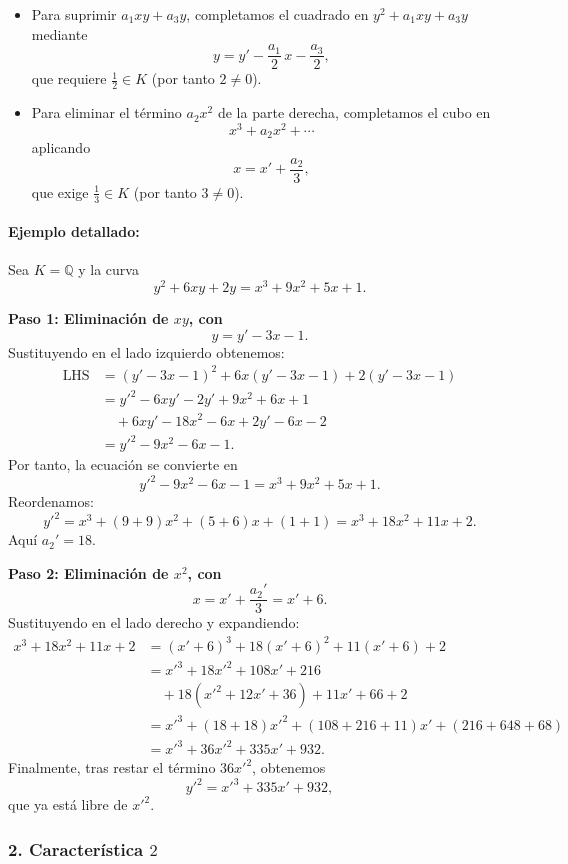 \begin{itemize}
  \item Para suprimir $a_1xy + a_3y$, completamos el cuadrado en $y^2 + a_1xy + a_3y$ mediante
    \[
      y = y' - \frac{a_1}{2}\,x - \frac{a_3}{2},
    \]
    que requiere $\tfrac12\in K$ (por tanto $2\neq0$).
  \item Para eliminar el término $a_2x^2$ de la parte derecha, completamos el cubo en
    \[
      x^3 + a_2x^2 + \cdots
    \]
    aplicando
    \[
      x = x' + \frac{a_2}{3},
    \]
    que exige $\tfrac13\in K$ (por tanto $3\neq0$).
\end{itemize}

\paragraph{Ejemplo detallado:}
Sea $K=\mathbb{Q}$ y la curva
$$
y^2 + 6xy + 2y = x^3 + 9x^2 + 5x + 1.
$$

\textbf{Paso 1: Eliminación de $xy$, con}
$$
y = y' - 3x - 1.
$$
Sustituyendo en el lado izquierdo obtenemos:
$$
\begin{aligned}
\text{LHS} &= (y' - 3x - 1)^2 + 6x(y' - 3x - 1) + 2(y' - 3x - 1)\\
&= y'^2 -6xy' -2y' +9x^2 +6x +1\\
&\quad +6xy' -18x^2 -6x +2y' -6x -2\\
&= y'^2 -9x^2 -6x -1.
\end{aligned}
$$
Por tanto, la ecuación se convierte en
$$
y'^2 -9x^2 -6x -1 = x^3 +9x^2 +5x +1.
$$
Reordenamos:
$$
y'^2 = x^3 + (9+9)x^2 + (5+6)x + (1+1) = x^3 + 18x^2 +11x +2.
$$
Aquí $a_2' = 18$.

\textbf{Paso 2: Eliminación de $x^2$, con}
$$
x = x' + \frac{a_2'}{3} = x' + 6.
$$
Sustituyendo en el lado derecho y expandiendo:
$$
\begin{aligned}
x^3 + 18x^2 + 11x + 2 &= (x'+6)^3 + 18(x'+6)^2 + 11(x'+6) + 2\\
&= x'^3 + 18x'^2 + 108x' +216 \\ 
&\quad +18(x'^2+12x'+36) +11x' +66 +2\\
&= x'^3 + (18+18)x'^2 + (108+216+11)x' + (216+648+68)\\
&= x'^3 + 36x'^2 + 335x' + 932.
\end{aligned}
$$
Finalmente, tras restar el término $36x'^2$, obtenemos
$$
y'^2 = x'^3 + 335x' + 932,
$$
que ya está libre de $x'^2$.

\subsubsection*{2. Característica $2$}


